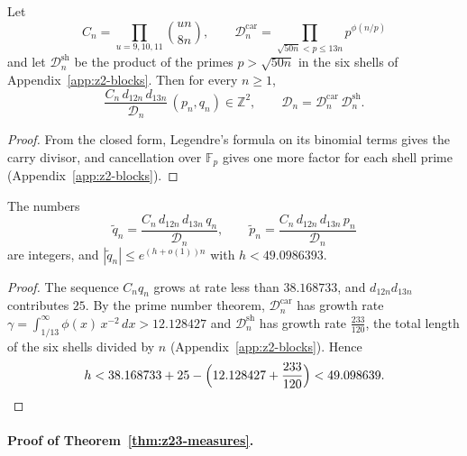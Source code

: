 \begin{lemma}\label{prop:zeta2-int}
Let 
\[
C_n=\prod_{u=9,10,11}\binom{un}{8n},\qquad \mathcal D^{\mathrm{car}}_n=\prod_{\sqrt{50n}<p\le13n}p^{\phi(n/p)}
\] 
and let $\mathcal D^{\mathrm{sh}}_n$ be the product of the primes $p>\sqrt{50n}$ in the six shells of Appendix~\ref{app:z2-blocks}. Then for every $n\ge1$,
\[
  \frac{C_n\,d_{12n}\,d_{13n}}{\mathcal D_n}\,(p_n,q_n)\in\mathbb Z^2,
  \qquad \mathcal D_n=\mathcal D^{\mathrm{car}}_n\,\mathcal D^{\mathrm{sh}}_n .
\]
\end{lemma}

\begin{proof}
From the closed form, Legendre's formula on its binomial terms gives the carry divisor, and cancellation over $\mathbb F_p$ gives one more factor for each shell prime (Appendix~\ref{app:z2-blocks}).
\end{proof}

\begin{lemma}\label{lem:z2-growth}
The numbers
\[
  \widetilde q_n=\frac{C_n\,d_{12n}\,d_{13n}\,q_n}{\mathcal D_n},\qquad
  \widetilde p_n=\frac{C_n\,d_{12n}\,d_{13n}\,p_n}{\mathcal D_n}
\]
are integers, and $|\widetilde q_n|\le e^{(h+o(1))n}$ with $h<49.0986393$.
\end{lemma}

\begin{proof}
The sequence $C_nq_n$ grows at rate less than $38.168733$, and $d_{12n}d_{13n}$ contributes $25$.
By the prime number theorem, $\mathcal D^{\mathrm{car}}_n$ has growth rate $\gamma=\int_{1/13}^\infty\phi(x)\,x^{-2}\,dx>12.128427$ and $\mathcal D^{\mathrm{sh}}_n$ has growth rate $\frac{233}{120}$, the total length of the six shells divided by $n$ (Appendix~\ref{app:z2-blocks}). Hence
\[
  h<38.168733+25-\Bigl(12.128427+\frac{233}{120}\Bigr)<49.098639 .
\]
\end{proof}
\paragraph{Proof of Theorem~\ref{thm:z23-measures}.}

